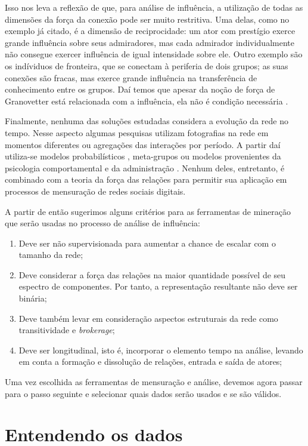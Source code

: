 \documentclass{article}
\begin{document}
Isso nos leva a reflexão de que, para análise de influência, a utilização de
todas as dimensões da força da conexão pode ser muito restritiva. Uma delas, como
no exemplo já citado, é a dimensão de reciprocidade: um ator com prestígio exerce
grande influência sobre seus admiradores, mas cada admirador individualmente não
consegue exercer influência de igual intensidade sobre ele. Outro exemplo são os
indíviduos de fronteira, que se conectam à periferia de dois grupos; as suas
conexões são fracas, mas exerce grande influência na transferência de
conhecimento entre os grupos. Daí temos que apesar da noção de força de
Granovetter está relacionada com a influência, ela não é condição necessária
\cite{Brown2007}.

Finalmente, nenhuma das soluções estudadas considera a evolução da rede no
tempo. Nesse aspecto algumas pesquisas utilizam fotografias na rede em
momentos diferentes ou agregações das interações por período. A partir daí
utiliza-se modelos probabilísticos \cite{Sarkar2005}, meta-grupos
\cite{Berger-Wolf2006} ou modelos provenientes da psicologia comportamental e da
administração \cite{Brelger2004}. Nenhum deles, entretanto, é combinado com
a teoria da força das relações para permitir sua aplicação em processos de
mensuração de redes sociais digitais.

A partir de então sugerimos alguns critérios para as ferramentas de mineração
que serão usadas no processo de análise de influência:

\begin{enumerate}
  \item Deve ser não supervisionada para aumentar a chance de escalar com o
  tamanho da rede;
  \item Deve considerar a força das relações na maior quantidade possível de seu
  espectro de componentes. Por tanto, a representação resultante não deve ser
  binária;
  \item Deve também levar em consideração aspectos estruturais da rede como
  transitividade e \textit{brokerage};
  \item Deve ser longitudinal, isto é, incorporar o elemento tempo na análise,
 levando em conta a formação e dissolução de relações, entrada e saída de
 atores;
\end{enumerate}

Uma vez escolhida as ferramentas de mensuração e análise, devemos agora passar
para o passo seguinte e selecionar quais dados serão usados e se são válidos.

\section{Entendendo os dados}
\end{document}
